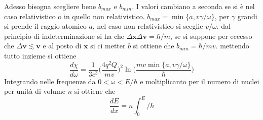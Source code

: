 \documentclass[11pt,a4paper]{report}
\newcommand{\vettore}[1]{\mathbf{#1}}
\begin{document}
		Adesso bisogna scegliere bene $b_{max}$ e $b_{min}$.\newline
		I valori cambiano a seconda se si è nel caso relativistico o in quello non relativistico.\newline
		$b_{max}=\min\{a,v\gamma/\omega\}$, per $\gamma$ grandi si prende il raggio atomico $a$, nel caso non relativistico si sceglie $v/\omega$.\newline
		dal principio di indeterminazione si ha che $\Delta \vettore x\Delta \vettore v=\hbar/m$, se si suppone per eccesso che $\Delta \vettore v\lesssim \vettore v$ e al posto di $\vettore x $ si ci metter $b$ si ottiene che $b_{min}=\hbar/mv$.\newline
		mettendo tutto inzieme si ottiene 
		\begin{equation}
			\frac{d\chi}{d\omega}=\frac1{3c^3 }\Big(\frac{4q^2Q}{mv}\Big)^2
			\ln\bigg(\frac{mv\min\{a,v\gamma/\omega\}}{\hbar}\bigg)
		\end{equation}
		Integrando nelle frequenze da $0<\omega<E/\hbar$ e moltiplicanto per il numero di nuclei per unità di volume $n$ si ottiene che 
		\begin{equation}
			\frac{dE}{dx}=n\int_0^E/\hbar
		\end{equation}
	
\end{document}
